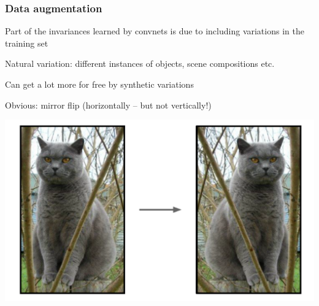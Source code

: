 \documentclass[xcolor=dvipsnames]{beamer}
\begin{document}
\begin{frame}
  \frametitle{Data augmentation}
  \bi
\item Part of the invariances learned by convnets is due to including
  variations in the training set
\item Natural variation: different instances of objects, scene
  compositions etc.
\item Can get a lot more for free by synthetic variations
\item Obvious: mirror flip (horizontally -- but not vertically!)

\includegraphics[width=.4\textwidth]{ak-mirror}\raisebox{1em}{[A. Karpathy]}

\ei
\end{frame}
\end{document}

